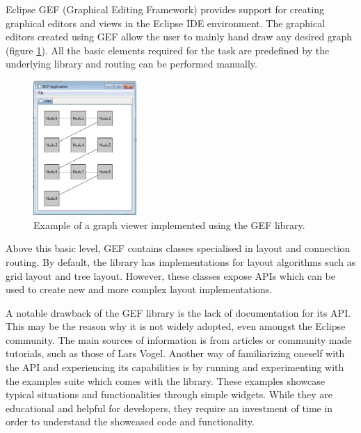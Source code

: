 Eclipse GEF (Graphical Editing Framework) provides support for creating graphical editors and views in the Eclipse IDE environment\cite{eclipse2007relwork}. The graphical 
editors created using GEF allow the user to mainly hand draw any desired graph (figure \ref{gef}). All the basic elements required for the task are predefined 
by the underlying library and routing can be performed manually.

\begin{figure}[ht] \centering
\includegraphics[width=0.35\textwidth]{img/relatedwork/gefexample.jpg}
\caption{Example of a graph viewer implemented using the GEF library.\protect\footnotemark \label{gef}} \end{figure}

Above this basic level, GEF contains classes specialised in layout and connection routing. By default, the library has implementations for 
layout algorithms such as grid layout and tree layout. However, these classes expose APIs which can be used to create new and more complex 
layout implementations.

A notable drawback of the GEF library is the lack of documentation for its API. This may be the reason why it is not widely 
adopted, even amongst the Eclipse community. The main sources of information is from articles or community made tutorials, such as 
those of Lars Vogel\cite{vogel2014contributing}. Another way of familiarizing oneself with the API and experiencing its capabilities is by running and experimenting 
with the examples suite which comes with the library. These examples showcase typical situations and functionalities through 
simple widgets. While they are educational and helpful for developers, they require an investment of time in order to understand 
the showcased code and functionality.

